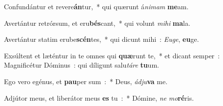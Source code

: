 ﻿\item Confundántur et revere\textbf{án}tur,~* qui quærunt á\emph{ni}\emph{mam} \textbf{me}am.
\item Avertántur retrórsum, et eru\textbf{bés}cant,~* qui volunt \emph{mi}\emph{hi} \textbf{ma}la.
\item Avertántur statim erube\textbf{scén}tes,~* qui dicunt mihi~: \emph{Eu}\emph{ge}, \textbf{eu}ge.
\item Exsúltent et læténtur in te omnes qui \textbf{quæ}runt te,~* et dicant semper~: Magnificétur Dóminus~: qui díligunt salu\emph{tá}\emph{re} \textbf{tu}um.
\item Ego vero egénus, et \textbf{pau}per sum~:~* Deus, \emph{ád}\emph{ju}\textbf{va} me.
\item Adjútor meus, et liberátor meus \textbf{es} tu~:~* Dómine, \emph{ne} \emph{mo}\textbf{ré}ris.